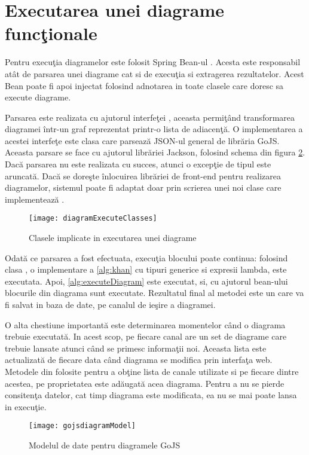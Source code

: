 \section{Executarea unei diagrame funcţionale}
Pentru execuţia diagramelor este folosit Spring Bean-ul . Acesta este responsabil atât de parsarea unei diagrame cat si de execuţia si extragerea rezultatelor. Acest Bean poate fi apoi injectat folosind adnotarea  in toate clasele care doresc sa execute diagrame.

Parsarea este realizata cu ajutorul interfeţei , aceasta permiţând transformarea diagramei într-un graf reprezentat printr-o lista de adiacenţă. O implementarea a acestei interfeţe este clasa  care parsează JSON-ul general de librăria GoJS. Aceasta parsare se face cu ajutorul librăriei Jackson, folosind schema din figura \cref{fig:gojsdiagramModel}. Dacă parsarea nu este realizata cu succes, atunci o excepţie de tipul  este aruncată.
Dacă se doreşte înlocuirea librăriei de front-end pentru realizarea diagramelor, sistemul poate fi adaptat doar prin scrierea unei noi clase care implementează .

\begin{figure}[H]
	\centering
	\texttt{[image: diagramExecuteClasses]}
	\caption{Clasele implicate in executarea unei diagrame}
	\label{fig:diagramExecuteClasses}
\end{figure}
Odată ce parsarea a fost efectuata, execuţia blocului poate continua: folosind clasa , o implementare a \cref{alg:khan} cu tipuri generice si expresii lambda, este executata. Apoi, \cref{alg:executeDiagram} este executat, si, cu ajutorul bean-ului  blocurile din diagrama sunt executate. Rezultatul final al metodei  este un  care va fi salvat in baza de date, pe canalul de ieşire a diagramei.

O alta chestiune importantă este determinarea momentelor când o diagrama trebuie executată. In acest scop, pe fiecare canal are un set de diagrame care trebuie lansate atunci când se primesc informaţii noi. Aceasta lista este actualizată de fiecare data când diagrama se modifica prin interfaţa web. Metodele din  folosite pentru a obţine lista de canale utilizate si pe fiecare dintre acestea, pe proprietatea  este adăugată acea diagrama. Pentru a nu se pierde consitenţa datelor, cat timp diagrama este modificata, ea nu se mai poate lansa in execuţie.
\begin{figure}[H]
	\centering
	\texttt{[image: gojsdiagramModel]}
	\caption{Modelul de date pentru diagramele GoJS}
	\label{fig:gojsdiagramModel}
\end{figure}
